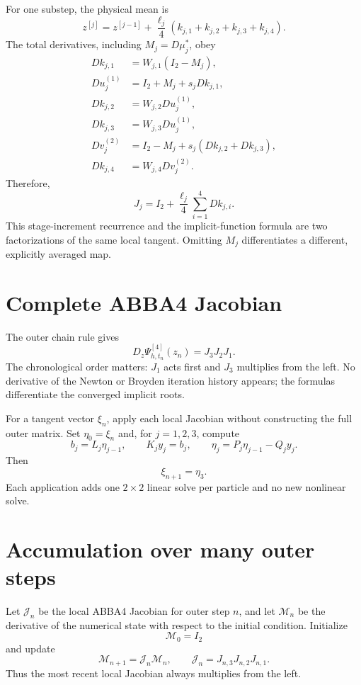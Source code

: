 \documentclass[11pt,a4paper]{article}
\newcommand{\Id}{I}
\begin{document}
For one substep, the physical mean is
\[
 z^{[j]}=z^{[j-1]}
 +\frac{\ell_j}{4}(k_{j,1}+k_{j,2}+k_{j,3}+k_{j,4}).
\]
The total derivatives, including $M_j=D\mu_j^*$, obey
\begin{align*}
 Dk_{j,1}&=W_{j,1}(\Id_2-M_j),\\
 Du_j^{(1)}&=\Id_2+M_j+s_jDk_{j,1},\\
 Dk_{j,2}&=W_{j,2}Du_j^{(1)},\\
 Dk_{j,3}&=W_{j,3}Du_j^{(1)},\\
 Dv_j^{(2)}&=\Id_2-M_j+s_j(Dk_{j,2}+Dk_{j,3}),\\
 Dk_{j,4}&=W_{j,4}Dv_j^{(2)}.
\end{align*}
Therefore,
\[
 \boxed{
 J_j=\Id_2+\frac{\ell_j}{4}
 \sum_{i=1}^4Dk_{j,i}.
 }
\]
This stage-increment recurrence and the implicit-function formula are two
factorizations of the same local tangent.  Omitting $M_j$ differentiates a
different, explicitly averaged map.

\section{Complete ABBA4 Jacobian}

The outer chain rule gives
\[
 \boxed{
 D_z\Psi^{[4]}_{h,t_n}(z_n)=J_3J_2J_1.
 }
\]
The chronological order matters: $J_1$ acts first and $J_3$ multiplies from
the left.  No derivative of the Newton or Broyden iteration history appears;
the formulas differentiate the converged implicit roots.

For a tangent vector $\xi_n$, apply each local Jacobian without constructing
the full outer matrix.  Set $\eta_0=\xi_n$ and, for $j=1,2,3$, compute
\[
 b_j=L_j\eta_{j-1},
 \qquad
 K_jy_j=b_j,
 \qquad
 \boxed{\eta_j=P_j\eta_{j-1}-Q_jy_j.}
\]
Then
\[
 \xi_{n+1}=\eta_3.
\]
Each application adds one $2\times2$ linear solve per particle and no new
nonlinear solve.

\section{Accumulation over many outer steps}

Let $\mathcal J_n$ be the local ABBA4 Jacobian for outer step $n$, and let
$\mathcal M_n$ be the derivative of the numerical state with respect to the
initial condition.  Initialize
\[
 \mathcal M_0=\Id_2
\]
and update
\[
 \boxed{
 \mathcal M_{n+1}=\mathcal J_n\mathcal M_n,
 \qquad
 \mathcal J_n=J_{n,3}J_{n,2}J_{n,1}.
 }
\]
Thus the most recent local Jacobian always multiplies from the left.
\end{document}
